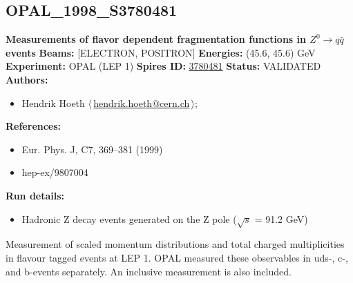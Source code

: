 \subsection[OPAL\_1998\_S3780481]{OPAL\_1998\_S3780481\,\cite{Ackerstaff:1998hz}}
\textbf{Measurements of flavor dependent fragmentation functions in $Z^0 \ensuremath{\to} q \bar{q}$ events}\newline
\textbf{Beams:} [ELECTRON, POSITRON] \newline
\textbf{Energies:} (45.6, 45.6) GeV \newline
\textbf{Experiment:} OPAL (LEP 1) \newline
\textbf{Spires ID:} \href{http://www.slac.stanford.edu/spires/find/hep/www?rawcmd=key+3780481}{3780481}\newline
\textbf{Status:} VALIDATED\newline
\textbf{Authors:}
\begin{itemize}
  \item Hendrik Hoeth $\langle\,$\href{mailto:hendrik.hoeth@cern.ch}{hendrik.hoeth@cern.ch}$\,\rangle$;
\end{itemize}
\textbf{References:}
\begin{itemize}
  \item Eur. Phys. J, C7, 369--381 (1999)
  \item hep-ex/9807004
\end{itemize}
\textbf{Run details:}
\begin{itemize}

  \item Hadronic Z decay events generated on the Z pole (\ensuremath{\sqrt{s}} = 91.2 GeV)\end{itemize}

\noindent Measurement of scaled momentum distributions and total charged multiplicities in flavour tagged events at LEP 1. OPAL measured these observables in uds-, c-, and b-events separately. An inclusive measurement is also included.

\clearpage


\clearpage

